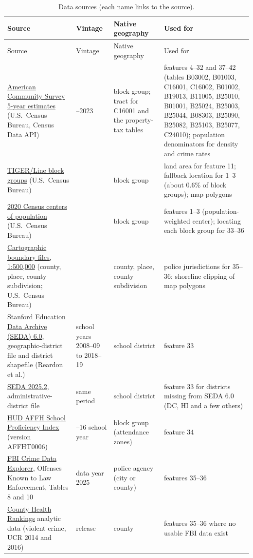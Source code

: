 \documentclass[11pt]{article}
\begin{document}
\begingroup\small
\setlength{\tabcolsep}{4pt}
\renewcommand{\arraystretch}{1.15}
\begin{longtable}{@{}>{\raggedright\arraybackslash}p{}>{\raggedright\arraybackslash}p{}>{\raggedright\arraybackslash}p{}>{\raggedright\arraybackslash}p{}@{}}
\caption{Data sources (each name links to the source).}\label{tab:sources}\\
\toprule
Source & Vintage & Native geography & Used for\\
\midrule\endfirsthead
\toprule
Source & Vintage & Native geography & Used for\\
\midrule\endhead
\bottomrule\endfoot
\href{https://api.census.gov/data/2023/acs/acs5/variables.html}{American Community Survey
5-year estimates} (U.S.\ Census Bureau, Census Data API)
 & 2019--2023 & block group; tract for C16001 and the property-tax tables
 & features 4--32 and 37--42 (tables B03002, B01003, C16001, C16002, B01002, B19013, B11005,
   B25010, B01001, B25024, B25003, B25044, B08303, B25090, B25082, B25103, B25077, C24010);
   population denominators for density and crime rates\\
\href{https://www2.census.gov/geo/tiger/TIGER2023/BG/}{TIGER/Line block groups}
(U.S.\ Census Bureau)
 & 2023 & block group
 & land area for feature 11; fallback location for 1--3 (about 0.6\% of block groups);
   map polygons\\
\href{https://www2.census.gov/geo/docs/reference/cenpop2020/blkgrp/}{2020 Census centers of
population} (U.S.\ Census Bureau)
 & 2020 & block group
 & features 1--3 (population-weighted center); locating each block group for 33--36\\
\href{https://www2.census.gov/geo/tiger/GENZ2023/shp/}{Cartographic boundary files,
1:500,000} (county, place, county subdivision; U.S.\ Census Bureau)
 & 2023 & county, place, county subdivision
 & police jurisdictions for 35--36; shoreline clipping of map polygons\\
\href{https://purl.stanford.edu/xh833nn4025}{Stanford Education Data Archive (SEDA) 6.0},
geographic-district file and district shapefile (Reardon et al.)
 & school years 2008--09 to 2018--19 & school district
 & feature 33\\
\href{https://purl.stanford.edu/np279jm6134}{SEDA 2025.2}, administrative-district file
 & same period & school district
 & feature 33 for districts missing from SEDA 6.0 (DC, HI and a few others)\\
\href{https://hub.arcgis.com/datasets/11a058178b9d471292ae2571e84d9ca8}{HUD AFFH School
Proficiency Index} (version AFFHT0006)
 & 2015--16 school year & 2010 block group (attendance zones)
 & feature 34\\
\href{https://cde.ucr.cjis.gov/}{FBI Crime Data Explorer}, Offenses Known to Law Enforcement,
Tables 8 and 10
 & data year 2025 & police agency (city or county)
 & features 35--36\\
\href{https://www.countyhealthrankings.org/sites/default/files/media/document/analytic_data2022.csv}{County
Health Rankings} analytic data (violent crime, UCR 2014 and 2016)
 & 2022 release & county
 & features 35--36 where no usable FBI data exist\\
\end{longtable}
\endgroup
\end{document}
